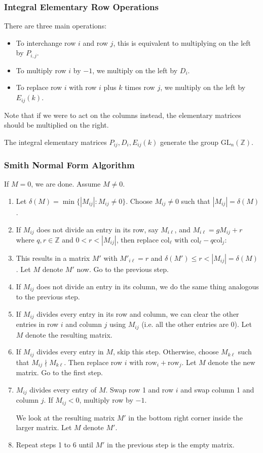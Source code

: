 \documentclass{article}
\begin{document}
\subsubsection{Integral Elementary Row Operations}
There are three main operations:
\begin{itemize}
    \item To interchange row $i$ and row $j$, this is equivalent to multiplying on the left by $P_{i,j}$.
    \item To multiply row $i$ by $-1$, we multiply on the left by $D_i$.
    \item To replace row $i$ with row $i$ plus $k$ times row $j$, we multiply on the left by $E_{ij}(k)$.
\end{itemize}
Note that if we were to act on the columns instead, the elementary matrices should be multiplied on the right.
\begin{idea}
    The integral elementary matrices $P_{ij},D_i,E_{ij}(k)$ generate the group $\text{GL}_n(\mathbb{Z})$.
\end{idea}
\subsubsection{Smith Normal Form Algorithm}
If $M=0$, we are done. Assume $M \neq 0$.
\begin{enumerate}
    \item Let $\delta(M) = \min\{|M_{ij}| : M_{ij} \neq 0\}$. Choose $M_{ij} \neq 0$ such that $|M_{ij}|=\delta(M)$.
    \item If $M_{ij}$ does not divide an entry in its row, say $M_{i\ell}$, and $M_{i\ell}=gM_{ij}+r$ where $q,r \in \mathbb{Z}$ and $0<r<|M_{ij}|$, then replace $\text{col}_{\ell}$ with $\text{col}_{\ell}-q\text{col}_{j}$:
    \item This results in a matrix $M'$ with $M'_{i\ell}=r$ and $\delta(M') \le r < |M_{ij}| = \delta(M)$. Let $M$ denote $M'$ now. Go to the previous step.
    \item If $M_{ij}$ does not divide an entry in its column, we do the same thing analogous to the previous step.
    \item If $M_{ij}$ divides every entry in its row and column, we can clear the other entries in row $i$ and column $j$ using $M_{ij}$ (i.e. all the other entries are $0$). Let $M$ denote the resulting matrix.
    \item If $M_{ij}$ divides every entry in $M$, skip this step. Otherwise, choose $M_{k\ell}$ such that $M_{ij} \nmid M_{k\ell}.$ Then replace row $i$ with $\text{row}_i+\text{row}_j$. Let $M$ denote the new matrix. Go to the first step.
    \item $M_{ij}$ divides every entry of $M$. Swap row 1 and row $i$ and swap column 1 and column $j$. If $M_{ij} < 0$, multiply row by $-1$.
    
    We look at the resulting matrix $M'$ in the bottom right corner inside the larger matrix. Let $M$ denote $M'$.
    \item Repeat steps 1 to 6 until $M'$ in the previous step is the empty matrix.
\end{enumerate}
\end{document}
